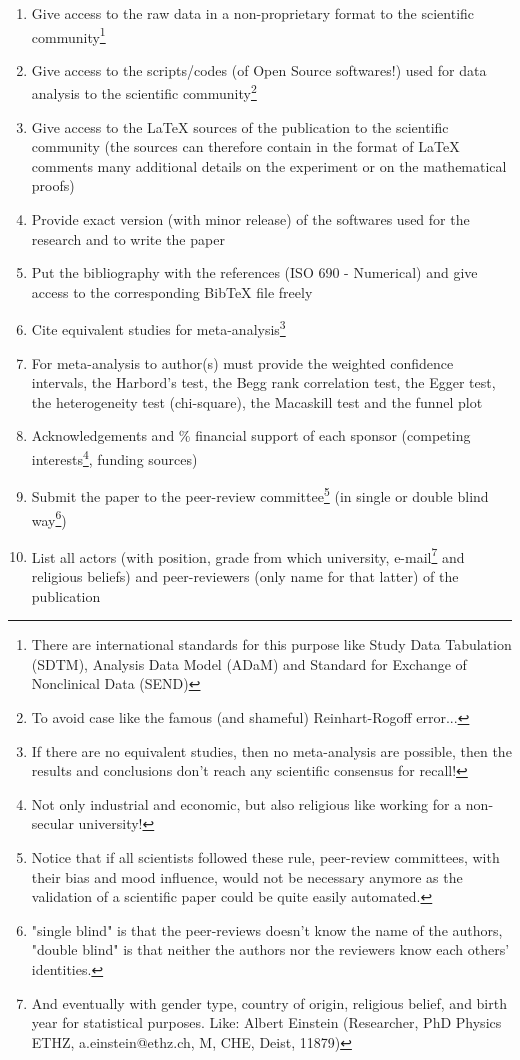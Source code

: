 \begin{enumerate}[label=\protect\circledbullet{\arabic*},leftmargin=15mm]
		\item Give access to the raw data in a non-proprietary format to the scientific community\footnote{There are international standards for this purpose like Study Data Tabulation (SDTM), Analysis Data Model (ADaM) and Standard for Exchange of Nonclinical Data (SEND)}
		
		\item Give access to the scripts/codes (of Open Source softwares!) used for data analysis to the scientific community\footnote{To avoid case like the famous (and shameful) Reinhart-Rogoff error...}
		
		\item Give access to the \LaTeX{} sources of the publication to the scientific community (the sources can therefore contain in the format of \LaTeX{} comments  many additional details on the experiment or on the mathematical proofs)
		
		\item Provide exact version (with minor release) of the softwares used for the research and to write the paper
		
		\item Put the bibliography with the references (ISO 690 - Numerical) and give access to the corresponding BibTeX file freely
		
		\item Cite equivalent studies for meta-analysis\footnote{If there are no equivalent studies, then no meta-analysis are possible, then the results and conclusions don't reach any scientific consensus for recall!}
		
		\item For meta-analysis to author(s) must provide the weighted confidence intervals, the Harbord's test, the Begg rank correlation test, the Egger test, the heterogeneity test (chi-square), the Macaskill test and the funnel plot
		
		\item Acknowledgements and \% financial support of each sponsor (competing interests\footnote{Not only industrial and economic, but also religious like working for a non-secular university!}, funding sources)
		
		\item Submit the paper to the peer-review committee\footnote{Notice that if all scientists followed these rule, peer-review committees, with their bias and mood influence, would not be necessary anymore as the validation of a scientific paper could be quite easily automated.} (in single or double blind way\footnote{"single blind" is that the peer-reviews doesn't know the name of the authors, "double blind" is that neither the authors nor the reviewers know each others' identities.})
		
		\item List all actors (with position, grade from which university, e-mail\footnote{And eventually with gender type, country of origin, religious belief, and birth year for statistical purposes. Like: Albert Einstein (Researcher, PhD Physics ETHZ, a.einstein@ethz.ch, M, CHE, Deist, 11879)} and religious beliefs) and peer-reviewers (only name for that latter) of the publication
	\end{enumerate}
